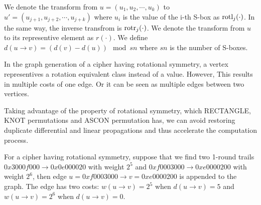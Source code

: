 We denote the transform from $u=(u_1,u_2,\cdots,u_k)$ to $u'=(u_{j+1},u_{j+2},\cdots,u_{j+k})$ where $u_i$ is the value of the i-th S-box as $\text{rotl}_j(\cdot)$. In the same way, the inverse transfrom is $\text{rotr}_j(\cdot)$. We denote the transform from $u$ to its representive element as $r(\cdot)$. We define $d(u\rightarrow v)=(d(v)-d(u))\mod sn$ where $sn$ is the number of S-boxes. 

In the graph generation of a cipher having rotational symmetry, a vertex representives a rotation equivalent class instead of a value. However, This results in multiple costs of one edge. Or it can be seen as multiple edges between two vertices. 

Taking advantage of the property of rotational symmetry, which RECTANGLE, KNOT permutations and ASCON permutation has, we can avoid restoring duplicate differential and linear propagations and thus accelerate the computation process. %

\begin{example}
	For a cipher having rotational symmetry, suppose that we find two 1-round trails $0x3000f000\rightarrow 0x0e000020$ with weight $2^5$ and $0xf0003000\rightarrow 0xe0000200$ with weight $2^6$, then edge $u=0xf0003000\rightarrow v=0xe0000200$ is appended to the graph. The edge has two costs: $w(u\rightarrow v)=2^5$ when $d(u\rightarrow v)=5$ and $w(u\rightarrow v)=2^6$ when $d(u\rightarrow v)=0$. 
\end{example}
